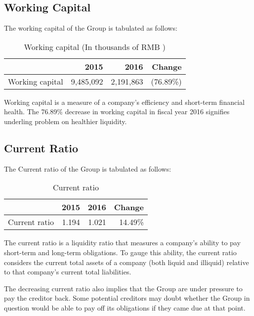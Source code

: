 \subsection{Working Capital}
The working capital of the Group is tabulated as follows:
\begin{table}[H]	
	\begin{center}
		\begin{tabular}{lrrr}
			\toprule
			&\textbf{2015}&\textbf{2016}&\textbf{Change}\\
			\midrule
			Working capital&9,485,092&2,191,863&(76.89\%)\\
			\bottomrule
		\end{tabular}
	\end{center}
	\caption{Working capital (In thousands of RMB \textyen)}\label{table:1}
\end{table}

Working capital is a measure of a company’s efficiency and short-term financial health. The 76.89\% decrease in working capital in fiscal year 2016 signifies underling problem on healthier liquidity.

\subsection{Current Ratio}
The Current ratio of the Group is tabulated as follows:
\begin{table}[H]	
	\begin{center}
		\begin{tabular}{lrrr}
			\toprule
			&\textbf{2015}&\textbf{2016}&\textbf{Change}\\
			\midrule
			Current ratio&1.194&1.021&14.49\%\\
			\bottomrule
		\end{tabular}
	\end{center}
	\caption{Current ratio}\label{table:1}
\end{table}

The current ratio is a liquidity ratio that measures a company's ability to pay short-term and long-term obligations. To gauge this ability, the current ratio considers the current total assets of a company (both liquid and illiquid) relative to that company’s current total liabilities. 

The decreasing current ratio also implies that the Group are under pressure to pay the creditor back. Some potential creditors may doubt whether the Group in question would be able to pay off its obligations if they came due at that point. 



